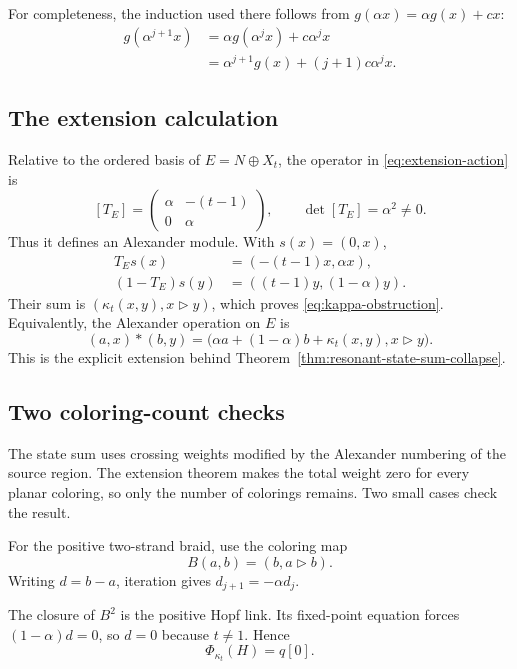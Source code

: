 For completeness, the induction used there follows from
$g(\alpha x)=\alpha g(x)+cx$:
\begin{align*}
 g(\alpha^{j+1}x)
 &=\alpha g(\alpha^jx)+c\alpha^jx\\
 &=\alpha^{j+1}g(x)+(j+1)c\alpha^jx.
\end{align*}

\subsection{The extension calculation}

Relative to the ordered basis of $E=N\oplus X_t$, the operator in
\eqref{eq:extension-action} is
\[
 [T_E]=
 \begin{pmatrix}
 \alpha&-(t-1)\\
 0&\alpha
 \end{pmatrix},
 \qquad
 \det[T_E]=\alpha^2\ne0.
\]
Thus it defines an Alexander module.  With $s(x)=(0,x)$,
\begin{align*}
 T_Es(x)&=(-(t-1)x,\alpha x),\\
 (1-T_E)s(y)&=((t-1)y,(1-\alpha)y).
\end{align*}
Their sum is $(\kappa_t(x,y),x\triangleright y)$, which proves
\eqref{eq:kappa-obstruction}.  Equivalently, the Alexander operation on $E$ is
\[
 (a,x)*(b,y)
 =\bigl(\alpha a+(1-\alpha)b+\kappa_t(x,y),
         x\triangleright y\bigr).
\]
This is the explicit extension behind
Theorem~\ref{thm:resonant-state-sum-collapse}.

\subsection{Two coloring-count checks}

The state sum uses crossing weights modified by the Alexander numbering of the
source region.  The extension theorem makes the total weight zero for every planar
coloring, so only the number of colorings remains.  Two small cases check the
result.

For the positive two-strand braid, use the coloring map
\[
 B(a,b)=(b,a\triangleright b).
\]
Writing $d=b-a$, iteration gives $d_{j+1}=-\alpha d_j$.

The closure of $B^2$ is the positive Hopf link.  Its fixed-point equation forces
$(1-\alpha)d=0$, so $d=0$ because $t\ne1$.  Hence
\begin{equation}
 \Phi_{\kappa_t}(H)=q[0].
 \label{eq:hopf-collapsed-state-sum}
\end{equation}

